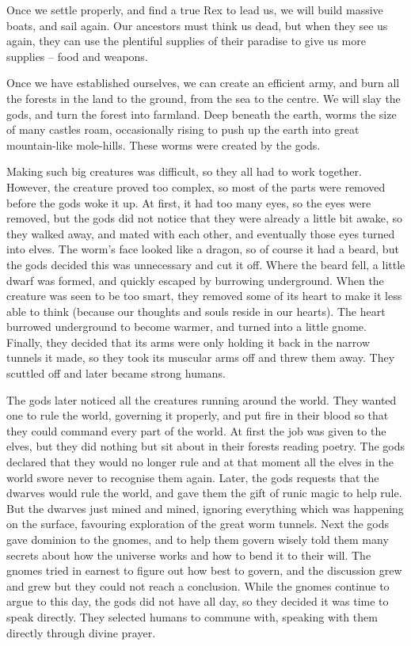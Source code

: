 \begin{multicols}{2}
\begin{exampletext}
  Once we settle properly, and find a true Rex to lead us, we will build massive boats, and sail again.
  Our ancestors must think us dead, but when they see us again, they can use the plentiful supplies of their paradise to give us more supplies -- food and weapons.

  Once we have established ourselves, we can create an efficient army, and burn all the forests in the land to the ground, from the sea to the centre.
  We will slay the gods, and turn the forest into farmland.
\else
  \noindent
  Deep beneath the earth, worms the size of many castles roam, occasionally rising to push up the earth into great mountain-like mole-hills.
  These worms were created by the gods.

  Making such big creatures was difficult, so they all had to work together.
  However, the creature proved too complex, so most of the parts were removed before the gods woke it up.
  At first, it had too many eyes, so the eyes were removed, but the gods did not notice that they were already a little bit awake, so they walked away, and mated with each other, and eventually those eyes turned into elves.
  The worm's face looked like a dragon, so of course it had a beard, but the gods decided this was unnecessary and cut it off.
  Where the beard fell, a little dwarf was formed, and quickly escaped by burrowing underground.
  When the creature was seen to be too smart, they removed some of its heart to make it less able to think (because our thoughts and souls reside in our hearts).
  The heart burrowed underground to become warmer, and turned into a little gnome.
  Finally, they decided that its arms were only holding it back in the narrow tunnels it made, so they took its muscular arms off and threw them away.
  They scuttled off and later became strong humans.

  The gods later noticed all the creatures running around the world.
  They wanted one to rule the world, governing it properly, and put fire in their blood so that they could command every part of the world.
  At first the job was given to the elves, but they did nothing but sit about in their forests reading poetry.
  The gods declared that they would no longer rule and at that moment all the elves in the world swore never to recognise them again.
  Later, the gods requests that the dwarves would rule the world, and gave them the gift of runic magic to help rule.
  But the dwarves just mined and mined, ignoring everything which was happening on the surface, favouring exploration of the great worm tunnels.
  Next the gods gave dominion to the gnomes, and to help them govern wisely told them many secrets about how the universe works and how to bend it to their will.
  The gnomes tried in earnest to figure out how best to govern, and the discussion grew and grew but they could not reach a conclusion.
  While the gnomes continue to argue to this day, the gods did not have all day, so they decided it was time to speak directly.
  They selected humans to commune with, speaking with them directly through divine prayer.


\end{exampletext}
\end{multicols}
